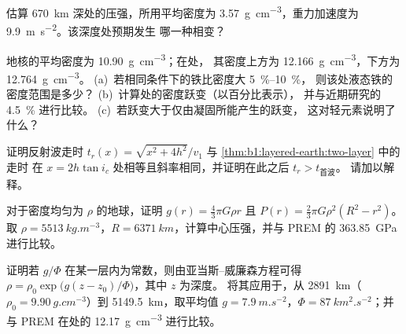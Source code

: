 \begin{exercise}[$\star\star$]\label{exo:b1:layered-earth:8}
估算 \qty{670}{km} 深处的压强，所用平均密度为
\qty{3.57}{g.cm^{-3}}，重力加速度为 \qty{9.9}{m.s^{-2}}。该深度处预期发生
哪一种相变？
\end{exercise}

\begin{exercise}[$\star\star$]\label{exo:b1:layered-earth:9}
地核的平均密度为 \qty{10.90}{g.cm^{-3}}；在处，
其密度上方为 \qty{12.166}{g.cm^{-3}}，下方为 \qty{12.764}{g.cm^{-3}}。
(a)~若相同条件下的铁比密度大 \qtyrange{5}{10}{\percent}，
则该处液态铁的密度范围是多少？
(b)~计算处的密度跃变（以百分比表示），
并与近期研究的 \qty{4.5}{\percent} 进行比较。
(c)~若跃变大于仅由凝固所能产生的跃变，
这对轻元素说明了什么？
\end{exercise}

\begin{exercise}[$\star\star\star$]\label{exo:b1:layered-earth:10}
证明反射波走时 $t_r(x) = \sqrt{x^2 + 4h^2}/v_1$ 与
\cref{thm:b1:layered-earth:two-layer} 中的走时
在 $x = 2h\tan i_c$ 处相等且斜率相同，并证明在此之后 $t_r > t_{\text{首波}}$。
请加以解释。
\end{exercise}

\begin{exercise}[$\star\star\star$]\label{exo:b1:layered-earth:11}
对于密度均匀为 $\rho$ 的地球，证明 $g(r) = \tfrac43\pi G\rho r$
且 $P(r) = \tfrac23\pi G\rho^2(R^2 - r^2)$。取
$\rho = \qty{5513}{kg.m^{-3}}$，$R = \qty{6371}{km}$，计算中心压强，并与 PREM 的
\qty{363.85}{GPa} 进行比较。
\end{exercise}

\begin{exercise}[$\star\star\star$]\label{exo:b1:layered-earth:12}
证明若 $g/\Phi$ 在某一层内为常数，则由亚当斯–威廉森方程可得
$\rho = \rho_0\exp\bigl(g(z - z_0)/\Phi\bigr)$，其中 $z$ 为深度。
将其应用于，从 \qty{2891}{km}（$\rho_0 =
\qty{9.90}{g.cm^{-3}}$）到 \qty{5149.5}{km}，取平均值
$g = \qty{7.9}{m.s^{-2}}$，$\Phi = \qty{87}{km^2.s^{-2}}$；并与
PREM 在处的 \qty{12.17}{g.cm^{-3}} 进行比较。
\end{exercise}

